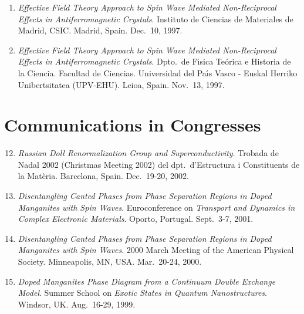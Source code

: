 \documentclass{article}
\begin{document}
\begin{enumerate}
\item 
{\it Effective Field Theory Approach to Spin Wave Mediated 
Non-Reciprocal Effects in Antiferromagnetic Crystals}. 
Instituto de Ciencias de Materiales de Madrid, CSIC. 
Madrid, Spain.
Dec.~10, 1997. 

\item 
{\it Effective Field Theory Approach to Spin Wave Mediated 
Non-Reciprocal Effects in Antiferromagnetic Crystals}. 
Dpto.\ de F\'{\i}sica Te\'orica e Historia de la Ciencia. 
Facultad de Ciencias. 
Universidad del Pa\'{\i}s Vasco - Euskal Herriko Unibertsitatea (UPV-EHU). 
Leioa, Spain.
Nov.~13, 1997. 
\end{enumerate}


\section*{Communications in Congresses}

\begin{enumerate}
\setcounter{enumi}{11}
\item
{\it Russian Doll Renormalization Group and Superconductivity}. 
Trobada de Nadal 2002 (Christmas Meeting 2002) del dpt.~d'Estructura 
i Constituents de la Mat\`eria. 
Barcelona, Spain.
Dec.~19-20, 2002.

\item
{\it Disentangling Canted Phases from Phase Separation Regions in Doped 
Manganites with Spin Waves}. 
Euroconference on {\sl Transport and Dynamics in Complex Electronic Materials}.
Oporto, Portugal. 
Sept.~3-7, 2001. 

\item 
{\it Disentangling Canted Phases from Phase
Separation Regions in Doped Manganites with Spin Waves}.
2000 March Meeting of the American Physical Society. 
Minneapolis, MN, USA. 
Mar.~20-24, 2000.

\item 
{\it Doped Manganites Phase Diagram from a Continuum Double Exchange Model}. 
Summer School on {\sl Exotic States in Quantum Nanostructures}. 
Windsor, UK. 
Aug.~16-29, 1999.
\end{enumerate}
\end{document}
